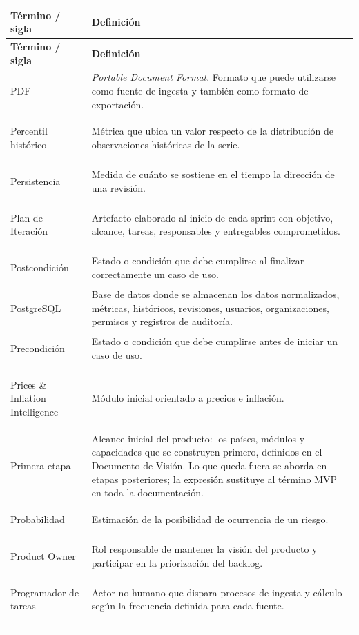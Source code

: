 \documentclass[11pt,a4paper]{article}
\makeatletter
\newenvironment{glosario}{%
  \renewcommand{\arraystretch}{1.18}%
  \begin{longtable}{@{}>{\raggedright\arraybackslash\bfseries}p{4.0cm} >{\raggedright\arraybackslash}p{10.7cm}@{}}
  \toprule
  \textbf{T\'ermino / sigla} & \textbf{Definici\'on} \\
  \midrule
  \endfirsthead
  \toprule
  \textbf{T\'ermino / sigla} & \textbf{Definici\'on} \\
  \midrule
  \endhead
  \bottomrule
  \endfoot
}{%
  \end{longtable}
  \renewcommand{\arraystretch}{1}%
}
\makeatother
\begin{document}
\begin{glosario}
PDF & \emph{Portable Document Format}. Formato que puede utilizarse como fuente de ingesta y tambi\'en como formato de exportaci\'on. \\
\addlinespace

Percentil hist\'orico & M\'etrica que ubica un valor respecto de la distribuci\'on de observaciones hist\'oricas de la serie. \\
\addlinespace

Persistencia & Medida de cu\'anto se sostiene en el tiempo la direcci\'on de una revisi\'on. \\
\addlinespace

Plan de Iteraci\'on & Artefacto elaborado al inicio de cada sprint con objetivo, alcance, tareas, responsables y entregables comprometidos. \\
\addlinespace

Postcondici\'on & Estado o condici\'on que debe cumplirse al finalizar correctamente un caso de uso. \\
\addlinespace

PostgreSQL & Base de datos donde se almacenan los datos normalizados, m\'etricas, hist\'oricos, revisiones, usuarios, organizaciones, permisos y registros de auditor\'ia. \\
\addlinespace

Precondici\'on & Estado o condici\'on que debe cumplirse antes de iniciar un caso de uso. \\
\addlinespace

Prices \& Inflation Intelligence & M\'odulo inicial orientado a precios e inflaci\'on. \\
\addlinespace

Primera etapa & Alcance inicial del producto: los pa\'ises, m\'odulos y capacidades que se construyen primero, definidos en el Documento de Visi\'on. Lo que queda fuera se aborda en etapas posteriores; la expresi\'on sustituye al t\'ermino MVP en toda la documentaci\'on. \\
\addlinespace

Probabilidad & Estimaci\'on de la posibilidad de ocurrencia de un riesgo. \\
\addlinespace

Product Owner & Rol responsable de mantener la visi\'on del producto y participar en la priorizaci\'on del backlog. \\
\addlinespace

Programador de tareas & Actor no humano que dispara procesos de ingesta y c\'alculo seg\'un la frecuencia definida para cada fuente. \\
\addlinespace


\end{glosario}
\end{document}

